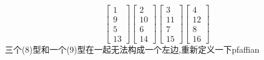 \documentclass[twoside,a4paper,CCT]{cctart}   %
\begin{document}
\begin{equation}
\begin{bmatrix}1\\9\\5\\13 \end{bmatrix}
\begin{bmatrix}2\\10\\6\\14 \end{bmatrix}
\begin{bmatrix}3\\11\\7\\15 \end{bmatrix}
\begin{bmatrix}4\\12\\8\\16 \end{bmatrix}
\end{equation}
三个(8)型和一个(9)型在一起无法构成一个左边,重新定义一下pfaffian
\end{document}

